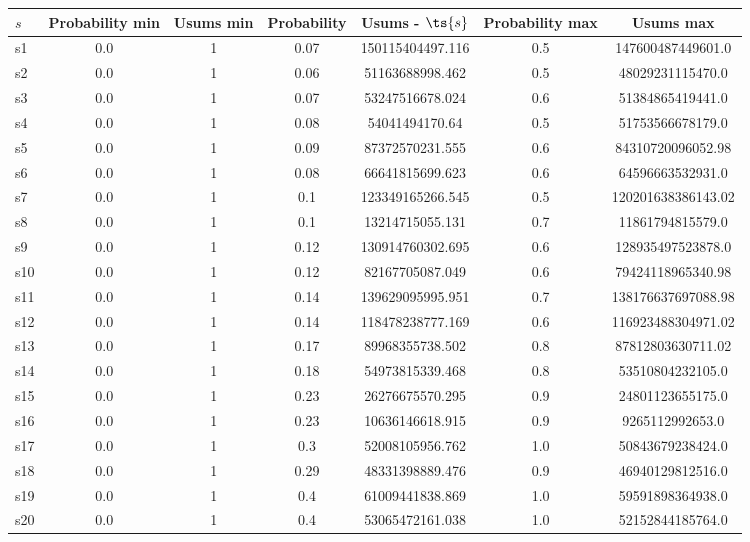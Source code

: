 \documentclass{article}
\begin{document}
\noindent\begin{tabular}{|l|c|c|c|c|c|c|}
\hline
$s$& Probability min & Usums min & Probability & Usums - $\ts{s}$ & Probability max & Usums max\\
\hline
s1 &0.0 & 1 & 0.07 & 150115404497.116 & 0.5 & 147600487449601.0\\
\hline
s2 &0.0 & 1 & 0.06 & 51163688998.462 & 0.5 & 48029231115470.0\\
\hline
s3 &0.0 & 1 & 0.07 & 53247516678.024 & 0.6 & 51384865419441.0\\
\hline
s4 &0.0 & 1 & 0.08 & 54041494170.64 & 0.5 & 51753566678179.0\\
\hline
s5 &0.0 & 1 & 0.09 & 87372570231.555 & 0.6 & 84310720096052.98\\
\hline
s6 &0.0 & 1 & 0.08 & 66641815699.623 & 0.6 & 64596663532931.0\\
\hline
s7 &0.0 & 1 & 0.1 & 123349165266.545 & 0.5 & 120201638386143.02\\
\hline
s8 &0.0 & 1 & 0.1 & 13214715055.131 & 0.7 & 11861794815579.0\\
\hline
s9 &0.0 & 1 & 0.12 & 130914760302.695 & 0.6 & 128935497523878.0\\
\hline
s10 &0.0 & 1 & 0.12 & 82167705087.049 & 0.6 & 79424118965340.98\\
\hline
s11 &0.0 & 1 & 0.14 & 139629095995.951 & 0.7 & 138176637697088.98\\
\hline
s12 &0.0 & 1 & 0.14 & 118478238777.169 & 0.6 & 116923488304971.02\\
\hline
s13 &0.0 & 1 & 0.17 & 89968355738.502 & 0.8 & 87812803630711.02\\
\hline
s14 &0.0 & 1 & 0.18 & 54973815339.468 & 0.8 & 53510804232105.0\\
\hline
s15 &0.0 & 1 & 0.23 & 26276675570.295 & 0.9 & 24801123655175.0\\
\hline
s16 &0.0 & 1 & 0.23 & 10636146618.915 & 0.9 & 9265112992653.0\\
\hline
s17 &0.0 & 1 & 0.3 & 52008105956.762 & 1.0 & 50843679238424.0\\
\hline
s18 &0.0 & 1 & 0.29 & 48331398889.476 & 0.9 & 46940129812516.0\\
\hline
s19 &0.0 & 1 & 0.4 & 61009441838.869 & 1.0 & 59591898364938.0\\
\hline
s20 &0.0 & 1 & 0.4 & 53065472161.038 & 1.0 & 52152844185764.0\\
\hline
\end{tabular}\\
\end{document}
